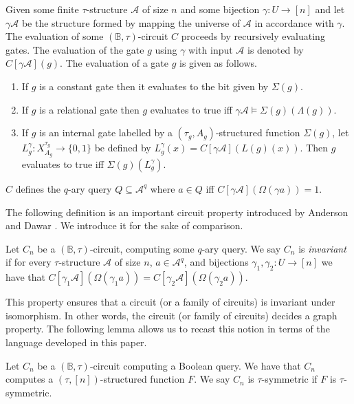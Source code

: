 \documentclass[../paper.tex]{subfiles}
\begin{document}
Given some finite $\tau$-structure $\mathcal{A}$ of size $n$ and some bijection
$\gamma: U \rightarrow [n]$ and let $\gamma \mathcal{A}$ be the structure formed
by mapping the universe of $\mathcal{A}$ in accordance with $\gamma$. The
evaluation of some $(\mathbb{B}, \tau)$-circuit $C$ proceeds by recursively
evaluating gates. The evaluation of the gate $g$ using $\gamma$ with input
$\mathcal{A}$ is denoted by $C[\gamma \mathcal{A}](g)$. The evaluation of a gate
$g$ is given as follows.
\begin{enumerate}
  \setlength\itemsep{0mm}
\item If $g$ is a constant gate then it evaluates to the bit given by
  $\Sigma(g)$.
\item If $g$ is a relational gate then $g$ evaluates to true iff $\gamma
  \mathcal{A} \models \Sigma(g)(\Lambda (g))$.
\item If $g$ is an internal gate labelled by a $(\tau_g, A_g)$-structured
  function $\Sigma(g)$, let $L^{\gamma}_g: X^{\tau_g}_{A_g} \rightarrow \{0,1\}$
  be defined by $L^{\gamma}_g(x) = C[\gamma \mathcal{A}](L(g)(x))$. Then $g$
  evaluates to true iff $\Sigma(g) (L^{\gamma}_g)$.
\end{enumerate}
$C$ defines the $q$-ary query $Q \subseteq \mathcal{A}^q$ where $a \in Q$ iff
$C[\gamma \mathcal{A}](\Omega (\gamma a)) = 1$.

The following definition is an important circuit property introduced by Anderson
and Dawar \cite{AndersonD17}. We introduce it for the sake of comparison.

\begin{definition}
  Let $C_n$ be a $(\mathbb{B}, \tau)$-circuit, computing some $q$-ary query. We
  say $C_n$ is \emph{invariant} if for every $\tau$-structure $\mathcal{A}$ of
  size $n$, $a \in \mathcal{A}^q$, and bijections $\gamma_1, \gamma_2: U
  \rightarrow [n]$ we have that $C[\gamma_1 \mathcal{A}](\Omega (\gamma_1 a)) =
  C[\gamma_2 \mathcal{A}](\Omega (\gamma_2 a))$.
\end{definition}

This property ensures that a circuit (or a family of circuits) is invariant
under isomorphism. In other words, the circuit (or family of circuits) decides a
graph property. The following lemma allows us to recast this notion in terms of
the language developed in this paper.

\begin{definition}
  Let $C_n$ be a $(\mathbb{B}, \tau)$-circuit computing a Boolean query. We have
  that $C_n$ computes a $(\tau, [n])$-structured function $F$. We say $C_n$ is
  $\tau$-symmetric if $F$ is $\tau$-symmetric.
\end{definition}
\end{document}
